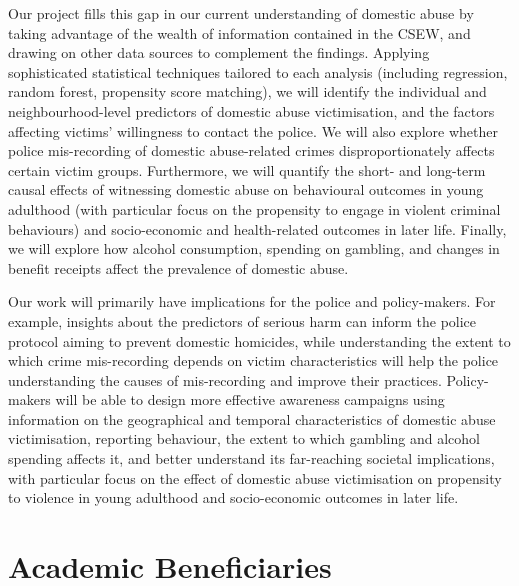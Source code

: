 \documentclass[11pt, a4paper]{article}
\begin{document}
Our project fills this gap in our current understanding of domestic abuse by taking advantage of the wealth of information contained in the CSEW, and drawing on other data sources to complement the findings. Applying sophisticated statistical techniques tailored to each analysis (including regression, random forest, propensity score matching), we will identify the individual and neighbourhood-level predictors of domestic abuse victimisation, and the factors affecting victims' willingness to contact the police. We will also explore whether police mis-recording of domestic abuse-related crimes \cite{HerMajestysInspectorateofConstabularyandFires&RescueServices2019}  disproportionately affects certain victim groups. Furthermore, we will quantify the short- and long-term causal effects of witnessing domestic abuse on behavioural outcomes in young adulthood (with particular focus on the propensity to engage in violent criminal behaviours) and socio-economic and health-related outcomes in later life. Finally, we will explore how alcohol consumption, spending on gambling, and changes in benefit receipts affect the prevalence of domestic abuse.
 
 

Our work will primarily have implications for the police and policy-makers. For example, insights about the predictors of serious harm can inform the police protocol aiming to prevent domestic homicides, while understanding the extent to which crime mis-recording depends on victim characteristics will help the police understanding the causes of mis-recording and improve their practices. Policy-makers will be able to design more effective awareness campaigns using information on the geographical and temporal characteristics of domestic abuse victimisation, reporting behaviour, the extent to which gambling and alcohol spending affects it, and better understand its far-reaching societal implications, with particular focus on the effect of domestic abuse victimisation on propensity to violence in young adulthood and  socio-economic outcomes in later life. 


\section{Academic Beneficiaries}
\end{document}
